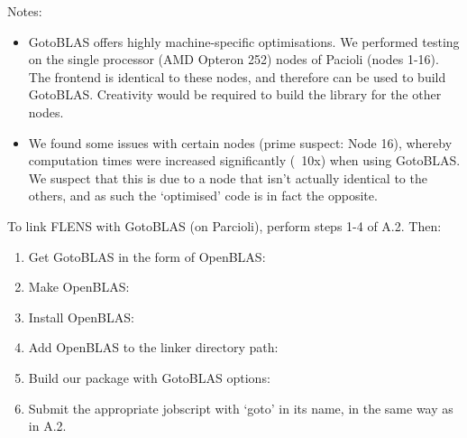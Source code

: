  Notes:
 \begin{itemize}
    \item GotoBLAS offers highly machine-specific optimisations. We performed testing on the single processor (AMD Opteron 252) nodes of Pacioli (nodes 1-16). The frontend is identical to these nodes, and therefore can be used to build GotoBLAS. Creativity would be required to build the library for the other nodes.
    \item We found some issues with certain nodes (prime suspect: Node 16), whereby computation times were increased significantly (~10x) when using GotoBLAS. We suspect that this is due to a node that isn't actually identical to the others, and as such the `optimised' code is in fact the opposite.
 \end{itemize}
 To link FLENS with GotoBLAS (on Parcioli), perform steps 1-4 of A.2. Then:
 
 \begin{enumerate}
    \item Get GotoBLAS in the form of OpenBLAS:
    \item Make OpenBLAS:
    \item Install OpenBLAS:
    \item Add OpenBLAS to the linker directory path:
    
    \item Build our package with GotoBLAS options:
    \item Submit the appropriate jobscript with `goto' in its name, in the same way as in A.2.
\end{enumerate}
    
    
    
    
    
    
    
    
    
    
    
      
      